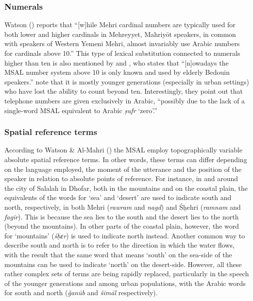 \documentclass[output=paper]{langsci/langscibook}
\begin{document}
 \subsubsection{Numerals}

Watson (\citeyear[3]{Watson2012}) reports that ``[w]hile  Mehri cardinal numbers  are  typically  used  for  both  lower  and  higher  cardinals  in  Mehreyyet, Mahriyōt  speakers,  in  common  with  speakers  of  Western  Yemeni  Mehri, almost invariably use Arabic numbers for cardinals above 10.'' This type of lexical substitution connected to numerals higher than ten is also mentioned by \citet{Lonnet2011} and \citet[1088]{Simeone-Senelle2011}, who states that ``[n]owadays the MSAL number system above 10 is only known and used by elderly Bedouin speakers.'' \citet[90]{WatsonAl-Mahri2017} note that it is mostly younger generations (especially in urban settings) who have lost the ability to count beyond ten. Interestingly, they point out that telephone numbers are given exclusively in Arabic, “possibly due to the lack of a single-word MSAL equivalent to Arabic \textit{ṣufr} ‘zero’.”


 \subsubsection{Spatial reference terms}

According to Watson \& Al-Mahri (\citeyear[91]{WatsonAl-Mahri2017}) the MSAL employ topographically variable absolute spatial reference terms. In other words, these terms can differ depending on the language employed, the moment of the utterance and the position of the speaker in relation to absolute points of reference. For instance, in and around the city of Salalah in Dhofar, both in the mountains and on the coastal plain, the equivalents of the words for ‘sea’ and ‘desert’ are used to indicate south and north, respectively, in both Mehri (\textit{rawram} and \textit{nagd}) and Śḥehri (\textit{ramnam} and \textit{fagir}). This is because the sea lies to the south and the desert lies to the north (beyond the mountains). In other parts of the coastal plain, however, the word for ‘mountains’ (\textit{śḥɛr}) is used to indicate north instead. Another common way to describe south and north is to refer to the direction in which the water flows, with the result that the same word that means ‘south’ on the sea-side of the mountains can be used to indicate ‘north’ on the desert-side. However, all these rather complex sets of terms are being rapidly replaced, particularly in the speech of the younger generations and among urban populations, with the Arabic words for south and north (\textit{ǧanūb} and \textit{šimāl} respectively).
\end{document}
